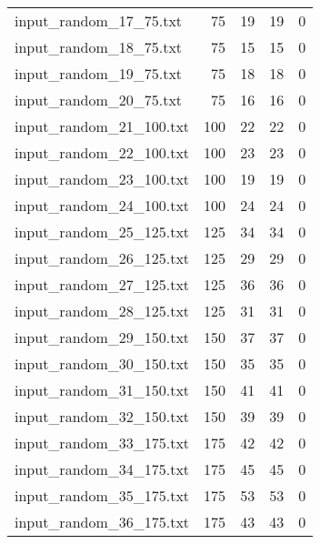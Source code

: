 \begin{table}[H]
\begin{tabular}{lrccc}
     input\_random\_17\_75.txt  &      75 &        19 &                 19 &           0     \\
     input\_random\_18\_75.txt  &      75 &        15 &                 15 &           0     \\
     input\_random\_19\_75.txt  &      75 &        18 &                 18 &           0     \\
     input\_random\_20\_75.txt  &      75 &        16 &                 16 &           0     \\
     input\_random\_21\_100.txt &     100 &        22 &                 22 &           0     \\
     input\_random\_22\_100.txt &     100 &        23 &                 23 &           0     \\
     input\_random\_23\_100.txt &     100 &        19 &                 19 &           0     \\
     input\_random\_24\_100.txt &     100 &        24 &                 24 &           0     \\
     input\_random\_25\_125.txt &     125 &        34 &                 34 &           0     \\
     input\_random\_26\_125.txt &     125 &        29 &                 29 &           0     \\
     input\_random\_27\_125.txt &     125 &        36 &                 36 &           0     \\
     input\_random\_28\_125.txt &     125 &        31 &                 31 &           0     \\
     input\_random\_29\_150.txt &     150 &        37 &                 37 &           0     \\
     input\_random\_30\_150.txt &     150 &        35 &                 35 &           0     \\
     input\_random\_31\_150.txt &     150 &        41 &                 41 &           0     \\
     input\_random\_32\_150.txt &     150 &        39 &                 39 &           0     \\
     input\_random\_33\_175.txt &     175 &        42 &                 42 &           0     \\
     input\_random\_34\_175.txt &     175 &        45 &                 45 &           0     \\
     input\_random\_35\_175.txt &     175 &        53 &                 53 &           0     \\
     input\_random\_36\_175.txt &     175 &        43 &                 43 &           0     \\

\end{tabular}
\end{table}
